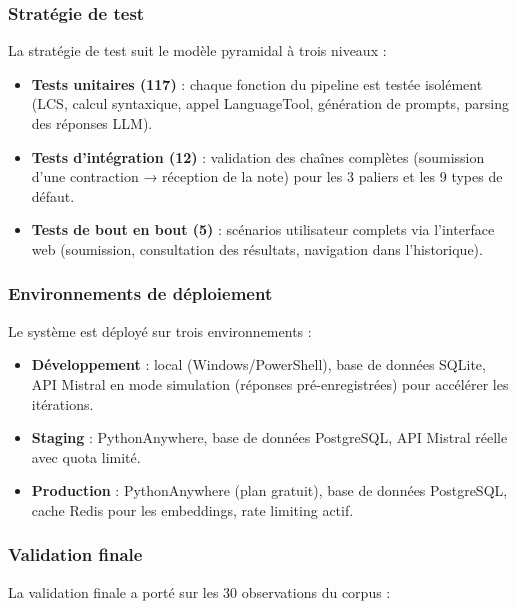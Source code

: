 \subsubsection{Stratégie de test}

La stratégie de test suit le modèle pyramidal à trois niveaux :

\begin{itemize}
    \item \textbf{Tests unitaires (117)} : chaque fonction du pipeline est testée isolément (LCS, calcul syntaxique, appel LanguageTool, génération de prompts, parsing des réponses LLM).
    \item \textbf{Tests d'intégration (12)} : validation des chaînes complètes (soumission d'une contraction → réception de la note) pour les 3 paliers et les 9 types de défaut.
    \item \textbf{Tests de bout en bout (5)} : scénarios utilisateur complets via l'interface web (soumission, consultation des résultats, navigation dans l'historique).
\end{itemize}

\subsubsection{Environnements de déploiement}

Le système est déployé sur trois environnements :

\begin{itemize}
    \item \textbf{Développement} : local (Windows/PowerShell), base de données SQLite, API Mistral en mode simulation (réponses pré-enregistrées) pour accélérer les itérations.
    \item \textbf{Staging} : PythonAnywhere, base de données PostgreSQL, API Mistral réelle avec quota limité.
    \item \textbf{Production} : PythonAnywhere (plan gratuit), base de données PostgreSQL, cache Redis pour les embeddings, rate limiting actif.
\end{itemize}

\subsubsection{Validation finale}

La validation finale a porté sur les 30 observations du corpus :

